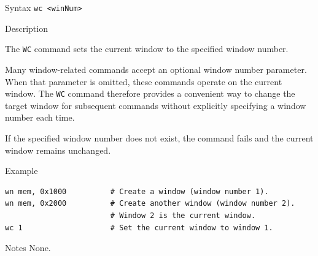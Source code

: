 %
%
\pagebreak
{}

\begin{iPageDescEntry}{Syntax}
\texttt{wc <winNum>} \\
\end{iPageDescEntry}

\begin{iPageDescEntry}{Description}

The \texttt{WC} command sets the current window to the specified window number.

Many window-related commands accept an optional window number parameter.
When that parameter is omitted, these commands operate on the current window.
The \texttt{WC} command therefore provides a convenient way to change the target
window for subsequent commands without explicitly specifying a window number
each time.

If the specified window number does not exist, the command fails and the current
window remains unchanged.

\end{iPageDescEntry}

\begin{iPageDescOpEntry}{Example}
\begin{lstlisting}[style=iPageOpStyle]
wn mem, 0x1000          # Create a window (window number 1).
wn mem, 0x2000          # Create another window (window number 2).
                        # Window 2 is the current window.
wc 1                    # Set the current window to window 1.
\end{lstlisting}
\end{iPageDescOpEntry}

\begin{iPageDescEntry}{Notes}
None.
\end{iPageDescEntry}

